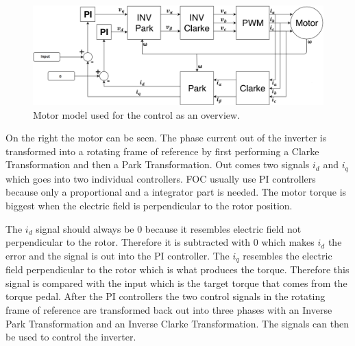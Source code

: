 \begin{figure} [H]
    \centering
    \includegraphics[scale=0.42]{pictures/control/udklip.PNG}
    \caption{Motor model used for the control as an overview.}
    \label{fig:Motor_model}
\end{figure} 

On the right the motor can be seen. The phase current out of the inverter is transformed into a rotating frame of reference by first performing a Clarke Transformation and then a Park Transformation. Out comes two signals $i_d$ and $i_q$ which goes into two individual controllers. FOC usually use PI controllers because only a proportional and a integrator part is needed.
The motor torque is biggest when the electric field is perpendicular to the rotor position.

The $i_d$ signal should always be $0$ because it resembles electric field not perpendicular to the rotor. Therefore it is subtracted with $0$ which makes $i_d$ the error and the signal is out into the PI controller. 
The $i_q$ resembles the electric field perpendicular to the rotor which is what produces the torque. Therefore this signal is compared with the input which is the target torque that comes from the torque pedal. After the PI controllers the two control signals in the rotating frame of reference are transformed back out into three phases with an Inverse Park Transformation and an Inverse Clarke Transformation. The signals can then be used to control the inverter.






